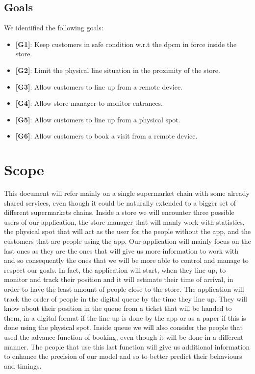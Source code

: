 \subsection{Goals}

We identified the following goals:

\begin{itemize}

	\item {\textbf{[G1]}}: Keep customers in safe condition w.r.t the \gls{dpcm} in force inside the store.
		
	\item {\textbf{[G2]}}: Limit the physical line situation in the proximity of the store.
		
	\item {\textbf{[G3]}}: Allow customers to line up from a remote device.
	
	\item {\textbf{[G4]}}: Allow store manager to monitor entrances.
	
	\item {\textbf{[G5]}}: Allow customers to line up from a physical spot.
	
	\item {\textbf{[G6]}}: Allow customers to book a visit from a remote
device.

\end{itemize}

\section{Scope}

This document will refer mainly on a single supermarket chain with some already shared services, even though it could be naturally extended to a bigger set of different supermarkets chains. Inside a store we will encounter three possible users of our application, the store manager that will manly work with statistics, the physical spot that will act as the user for the people without the app, and the customers that are people using the app.
 Our application will mainly focus on the last ones as they are the ones that will give us more information to work with and so consequently the ones that we will be more able to control and manage to respect our goals. In fact, the application will start, when they line up, to monitor and track their position and it will estimate their time of arrival, in order to have the least amount of people close to the store.
The application will track the order of people in the digital queue by the time they line up. They will know about their position in the queue from a ticket that will be handed to them, in a digital format if the line up is done by the app or as a paper if this is done using the physical spot. Inside queue we will also consider the people that used the advance function of booking, even though it will be done in a different manner. The people that use this last function will give us additional information to enhance the precision of our model and so to better predict their behaviours and timings. 

